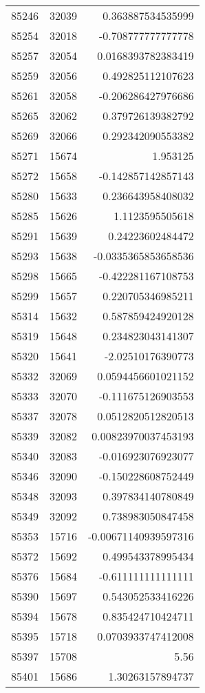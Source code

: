 \begin{tabular}{r | r | r}
85246 & 32039 & 0.363887534535999 \\
85254 & 32018 & -0.708777777777778 \\
85257 & 32054 & 0.0168393782383419 \\
85259 & 32056 & 0.492825112107623 \\
85261 & 32058 & -0.206286427976686 \\
85265 & 32062 & 0.379726139382792 \\
85269 & 32066 & 0.292342090553382 \\
85271 & 15674 & 1.953125 \\
85272 & 15658 & -0.142857142857143 \\
85280 & 15633 & 0.236643958408032 \\
85285 & 15626 & 1.1123595505618 \\
85291 & 15639 & 0.24223602484472 \\
85293 & 15638 & -0.0335365853658536 \\
85298 & 15665 & -0.422281167108753 \\
85299 & 15657 & 0.220705346985211 \\
85314 & 15632 & 0.587859424920128 \\
85319 & 15648 & 0.234823043141307 \\
85320 & 15641 & -2.02510176390773 \\
85332 & 32069 & 0.0594456601021152 \\
85333 & 32070 & -0.111675126903553 \\
85337 & 32078 & 0.0512820512820513 \\
85339 & 32082 & 0.00823970037453193 \\
85340 & 32083 & -0.016923076923077 \\
85346 & 32090 & -0.150228608752449 \\
85348 & 32093 & 0.397834140780849 \\
85349 & 32092 & 0.738983050847458 \\
85353 & 15716 & -0.00671140939597316 \\
85372 & 15692 & 0.499543378995434 \\
85376 & 15684 & -0.611111111111111 \\
85390 & 15697 & 0.543052533416226 \\
85394 & 15678 & 0.835424710424711 \\
85395 & 15718 & 0.0703933747412008 \\
85397 & 15708 & 5.56 \\
85401 & 15686 & 1.30263157894737 \\

\end{tabular}
